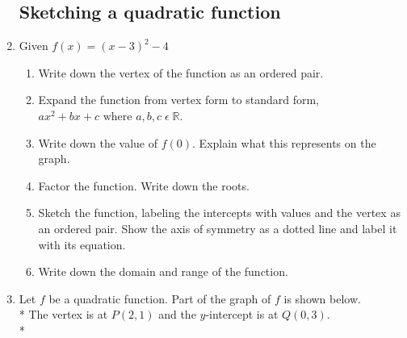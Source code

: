 \documentclass[12pt, twoside]{article}
\begin{document}
\begin{enumerate}[itemsep=0.5cm]
\subsection*{Sketching a quadratic function}
    \item   Given $f(x)=(x-3)^2-4$
    \begin{enumerate}[itemsep=0.9cm]
        \item Write down the vertex of the function as an ordered pair.
        \item Expand the function from vertex form to standard form, $ax^2+bx+c \text{ where } a, b, c \;  \epsilon \; \mathbb{R}$. \vspace{1cm}
        \item Write down the value of $f(0)$. Explain what this represents on the graph. \vspace{1cm}
        \item Factor the function. Write down the roots. \vspace{1cm}
        \item Sketch the function, labeling the intercepts with values and the vertex as an ordered pair. Show the axis of symmetry as a dotted line and label it with its equation.
        \begin{center}
            \end{center}
        \item Write down the domain and range of the function.
    \end{enumerate}

\newpage
  \item Let $f$ be a quadratic function. Part of the graph of $f$ is shown below.\\*
  The vertex is at $P(2,1)$ and the $y$-intercept is at $Q(0, 3)$.\\*

    \begin{figure}[!htbp]
    \begin{center}
\end{center}
\end{figure}
\end{enumerate}
\end{document}
